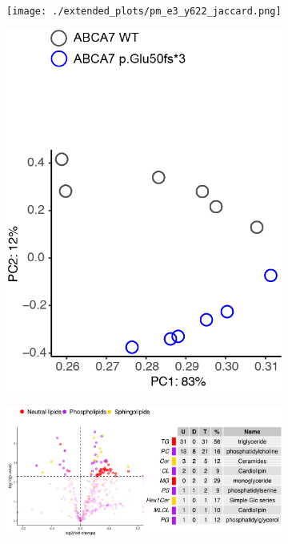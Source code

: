 \begin{figure}[ht]
    \begin{subfigure}[t]{.2\textwidth}
        \caption{}
        \texttt{[image: ./extended\_plots/pm\_e3\_y622\_jaccard.png]}        
    \end{subfigure} 
    \begin{subfigure}[t]{.2\textwidth}
        \caption{}
        \includegraphics[width=\textwidth]{./main_plots/g2_pca_lipids.png}        
    \end{subfigure} 
    \begin{subfigure}[t]{.3\textwidth}
        \caption{}
        \includegraphics[width=\textwidth]{./main_plots/iN_lipids_overview.png}        

\end{subfigure}
\end{figure}
